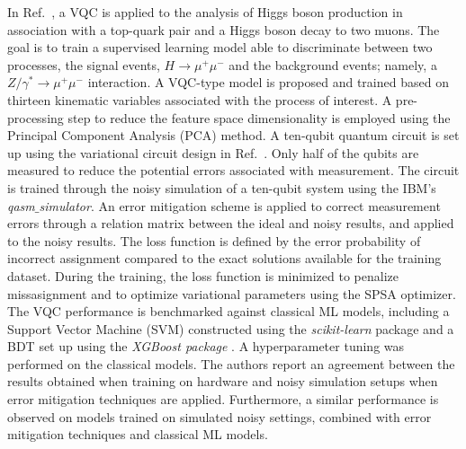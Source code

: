 In Ref.~\cite{2021Wu}, a VQC is applied to the analysis of Higgs boson production in association with a top-quark pair and a Higgs boson decay to two muons.
The goal is to train a supervised learning model able to discriminate between two processes, the signal events, $H\rightarrow\mu^{+}\mu^{-}$ and the background events; namely, a $Z/\gamma^{*}\rightarrow\mu^{+}\mu^{-}$ interaction.
A VQC-type model is proposed and trained based on thirteen kinematic variables associated with the process of interest.
A pre-processing step to reduce the feature space dimensionality is employed using the Principal Component Analysis (PCA) method.
A ten-qubit quantum circuit is set up using the variational circuit design in Ref.~\cite{Havlek2019}.
Only half of the qubits are measured to reduce the potential errors associated with measurement.
The circuit is trained through the noisy simulation of a ten-qubit system using the IBM's \emph{qasm$\_$simulator}.
An error mitigation scheme is applied to correct measurement errors through a relation matrix between the ideal and noisy results, and applied to the noisy results. 
The loss function is defined by the error probability of incorrect assignment compared to the exact solutions available for the training dataset.
During the training, the loss function is minimized to penalize missasignment and to optimize variational parameters using the SPSA optimizer.
The VQC performance is benchmarked against classical ML models, including a Support Vector Machine (SVM) constructed using the \emph{scikit-learn} package and a BDT set up using the \emph{XGBoost package} \cite{Chen:2016:XST:2939672.2939785}.
A hyperparameter tuning was performed on the classical models. The authors report an agreement between the results obtained when training on hardware and noisy simulation setups when error mitigation techniques are applied.
Furthermore, a similar performance is observed on models trained on simulated noisy settings, combined with error mitigation techniques and classical ML models.


